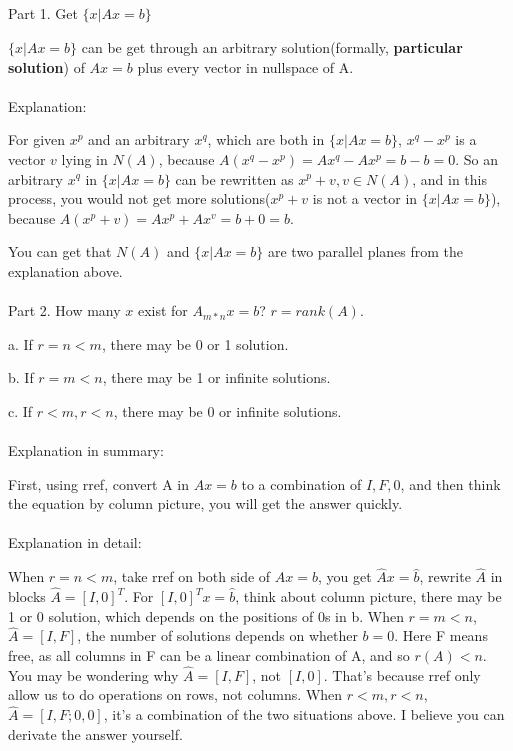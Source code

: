 \documentclass{article}
\begin{document}
\begin{spacing}{1.5}
\section{}
Part 1. Get $\{x|Ax=b\}$

$\{x|Ax=b\}$ can be get through an arbitrary solution(formally, {\bfseries particular solution}) of $Ax=b$ plus every vector in nullspace of A.
\\\\Explanation:

For given $x^p$ and an arbitrary $x^q$, which are both in $\{x|Ax=b\}$, $x^q - x^p$ is a vector $v$ lying in $N(A)$, because $A(x^q - x^p) = Ax^q - Ax^p= b - b = 0$. So an arbitrary $x^q$ in $\{x|Ax=b\}$ can be rewritten as $x^p+v, v \in N(A)$, and in this process, you would not get more solutions($x^p+v$ is not a vector in $\{x|Ax=b\}$), because $A(x^p + v) = Ax^p + Ax^v= b + 0 = b$.

You can get that $N(A)$ and $\{x|Ax=b\}$ are two parallel planes from the explanation above. 
\\\\ Part 2. How many $x$ exist for $A_{m*n}x=b$? $r=rank(A)$.

a. If $r = n < m$, there may be 0 or 1 solution.

b. If $r = m < n$, there may be 1 or infinite solutions.

c. If $r < m, r < n$, there may be 0 or infinite solutions.
\\\\ Explanation in summary: 

First, using rref, convert A in $Ax=b$ to a combination of $I, F, 0$, and then think the equation by column picture, you will get the answer quickly. 
\\\\ Explanation in detail:

When $r=n<m$, take rref on both side of $Ax=b$, you get $\hat A x = \hat b$, rewrite $\hat A$ in blocks $\hat A=[I, 0]^T$. For $[I, 0]^Tx=\hat b$, think about column picture, there may be 1 or 0 solution, which depends on the positions of 0s in b. When $r=m<n$, $\hat A = [I, F]$, the number of solutions depends on whether $b = 0$. Here F means free, as all columns in F can be a linear combination of A, and so $r(A) < n$. You may be wondering why $\hat A = [I, F]$, not $[I, 0]$. That's because rref only allow us to do operations on rows, not columns. When $r < m, r < n$, $\hat A=[I, F;0, 0]$, it's a combination of the two situations above. I believe you can derivate the answer yourself.\\



\end{spacing}
\end{document}
